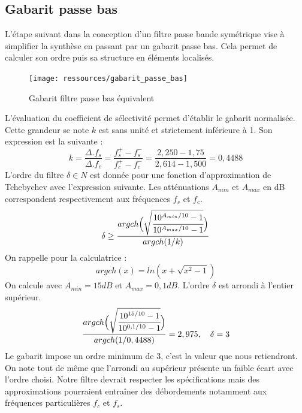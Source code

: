\documentclass[french]{article}
\begin{document}
\subsection{Gabarit passe bas}
L'étape suivant dans la conception d'un filtre passe bande symétrique vise à simplifier la synthèse en passant par un gabarit passe bas. Cela permet de calculer son ordre puis sa structure en éléments localisés.
\begin{figure}[H]
	\centering
	\texttt{[image: ressources/gabarit\_passe\_bas]}
	\caption{Gabarit filtre passe bas équivalent}
	\label{fig:gabaritpassepas}
\end{figure}
L'évaluation du coefficient de sélectivité permet d'établir le gabarit normalisée. Cette grandeur se note $k$ est sans unité et strictement inférieure à 1. Son expression est la suivante :
\begin{equation}
	k=\frac{\Delta.f_s}{\Delta.f_c}=\frac{f_s^+-f_s^-}{f_c^+-f_c^-}=\frac{2,250-1,75}{2,614-1,500}=0,4488
\end{equation}
L'ordre du filtre $\delta \in N$ est donnée pour une fonction d'approximation de Tchebychev avec l'expression suivante. Les atténuations $A_{min}$ et $A_{max}$ en dB correspondent respectivement aux fréquences $f_s$ et $f_c$.
\begin{equation}
\delta \geq \frac{argch
	\Big( \sqrt{\cfrac{10^{A_{min}/10}-1}{10^{A_{max}/10}-1}}
	\Big)
}{argch(1/k)}
\end{equation}
On rappelle pour la calculatrice :
\begin{equation}
argch(x)=ln(x+\sqrt{x^2-1})
\end{equation}
On calcule avec $A_{min} = 15dB$ et $A_{max} = 0,1dB$. L'ordre $\delta$ est arrondi à l'entier supérieur.
\begin{equation}
\frac{argch
	\Big( \sqrt{\cfrac{10^{15/10}-1}{10^{0,1/10}-1}}
	\Big)
}{argch(1/0,4488)} = 2,975, \quad \delta = 3
\end{equation}
Le gabarit impose un ordre minimum de 3, c'est la valeur que nous retiendront. On note tout de même que l'arrondi au supérieur présente un faible écart avec l'ordre choisi. Notre filtre devrait respecter les spécifications mais des approximations pourraient entraîner des débordements notamment aux fréquences particulières $f_c$ et $f_s$.
\end{document}
